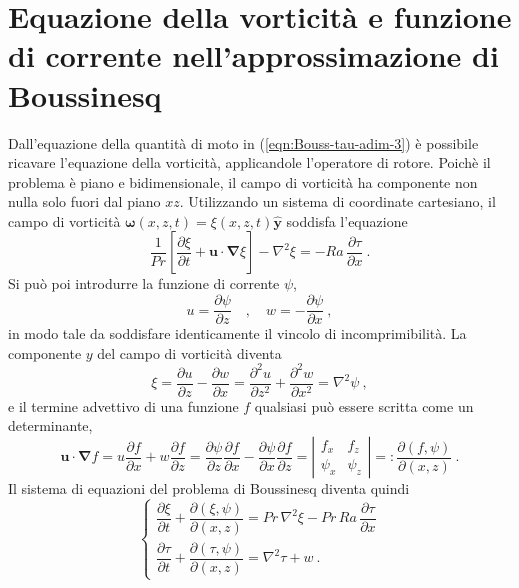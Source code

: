\documentclass{article}
\begin{document}
\section{Equazione della vorticità e funzione di corrente nell'approssimazione di Boussinesq}
Dall'equazione della quantità di moto in (\ref{eqn:Bouss-tau-adim-3}) è possibile ricavare l'equazione della vorticità, applicandole l'operatore di rotore. Poichè il problema è piano e bidimensionale, il campo di vorticità ha componente non nulla solo fuori dal piano $xz$. Utilizzando un sistema di coordinate cartesiano, il campo di vorticità $\bm{\omega}(x,z,t) = \xi(x,z,t) \bm{\hat{y}}$ soddisfa l'equazione
\begin{equation}
    \dfrac{1}{Pr} \left[ \dfrac{\partial \xi}{\partial t} +
      \bm{u} \cdot \bm{\nabla} \xi \right] -
      \nabla^2 \xi = - Ra \, \dfrac{\partial \tau}{\partial x} \ .
\end{equation}
Si può poi introdurre la funzione di corrente $\psi$,
\begin{equation}
    u =   \dfrac{\partial \psi}{ \partial z} \quad , \quad 
    w = - \dfrac{\partial \psi}{ \partial x} \ ,
\end{equation}
in modo tale da soddisfare identicamente il vincolo di incomprimibilità. La componente $y$ del campo di vorticità diventa
\begin{equation}
    \xi = \dfrac{\partial u}{\partial z} - \dfrac{\partial w}{\partial x} =
    \dfrac{\partial^2 u}{\partial z^2} +
    \dfrac{\partial^2 w}{\partial x^2} = 
    \nabla^2 \psi \ ,
\end{equation}
e il termine advettivo di una funzione $f$ qualsiasi può essere scritta come un determinante,
\begin{equation}
    \bm{u} \cdot \bm{\nabla} f = u \dfrac{\partial f}{\partial x} + w \dfrac{\partial f}{\partial z} =
    \dfrac{\partial \psi}{ \partial z} \dfrac{\partial f}{\partial x} - \dfrac{\partial \psi}{ \partial x} \dfrac{\partial f}{\partial z} = \left| \begin{matrix} f_x & f_z \\ \psi_x & \psi_z \end{matrix} \right| =: \dfrac{\partial(f,\psi)}{\partial(x,z)} \ .
\end{equation}
%
Il sistema di equazioni del problema di Boussinesq diventa quindi
\begin{equation}\label{eqn:Bouss-vort-psi-tau}
    \begin{cases}
      \dfrac{\partial \xi}{\partial t} +
      \dfrac{\partial(\xi,\psi)}{\partial(x,z)} 
      = Pr \, \nabla^2 \xi 
      - Pr \, Ra \, \dfrac{\partial \tau}{\partial x} \\
      \dfrac{\partial \tau}{\partial t} +
      \dfrac{\partial(\tau,\psi)}{\partial(x,z)} =
      \nabla^{2} \tau + w \ .
    \end{cases}
\end{equation}
\end{document}
